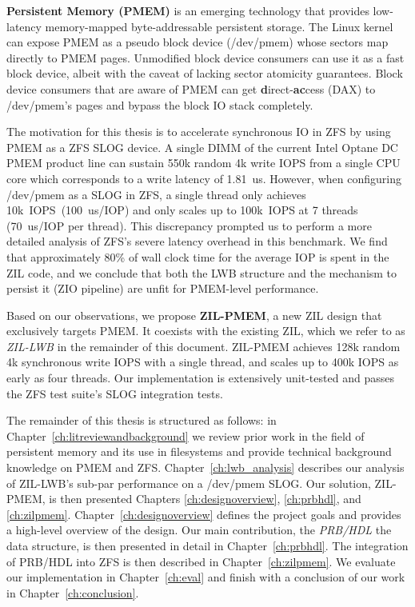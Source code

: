 \documentclass[12pt,a4paper,twoside]{book}
\begin{document}
\textbf{Persistent Memory (PMEM)} is an emerging technology that provides low-latency memory-mapped byte-addressable persistent storage.
The Linux kernel can expose PMEM as a pseudo block device (/dev/pmem) whose sectors map directly to PMEM pages.
Unmodified block device consumers can use it as a fast block device, albeit with the caveat of lacking sector atomicity guarantees.
Block device consumers that are aware of PMEM can get \textbf{d}irect-\textbf{ac}cess (DAX) to \mbox{/dev/pmem}'s pages and bypass the block IO stack completely.

The motivation for this thesis is to accelerate synchronous IO in ZFS by using PMEM as a ZFS SLOG device.
A single DIMM of the current Intel Optane DC PMEM product line can sustain 550k random 4k write IOPS from a single CPU core which corresponds to a write latency of 1.81~us.
However, when configuring /dev/pmem as a SLOG in ZFS, a single thread only achieves 10k~IOPS~(100~us/IOP) and only scales up to 100k~IOPS at 7 threads (70~us/IOP per thread).
This discrepancy prompted us to perform a more detailed analysis of ZFS's severe latency overhead in this benchmark.
We find that approximately 80\% of wall clock time for the average IOP is spent in the ZIL code, and
we conclude that both the LWB structure and the mechanism to persist it (ZIO pipeline) are unfit for PMEM-level performance.

Based on our observations, we propose \textbf{ZIL-PMEM}, a new ZIL design that exclusively targets PMEM.
It coexists with the existing ZIL, which we refer to as \textit{ZIL-LWB} in the remainder of this document.
ZIL-PMEM achieves 128k random 4k synchronous write IOPS with a single thread, and scales up to 400k IOPS as early as four threads.
Our implementation is extensively unit-tested and passes the ZFS test suite's SLOG integration tests.

The remainder of this thesis is structured as follows:
in Chapter~\ref{ch:litreviewandbackground} we
 review prior work in the field of persistent memory and its use in filesystems and
 provide technical background knowledge on PMEM and ZFS.
Chapter~\ref{ch:lwb_analysis} describes our analysis of ZIL-LWB's sub-par performance on a /dev/pmem SLOG.
Our solution, \mbox{ZIL-PMEM}, is then presented Chapters \ref{ch:designoverview}, \ref{ch:prbhdl}, and \ref{ch:zilpmem}.
Chapter~\ref{ch:designoverview} defines the project goals and provides a high-level overview of the design.
Our main contribution, the \textit{PRB/HDL} the data structure, is then presented in detail in Chapter~\ref{ch:prbhdl}.
The integration of PRB/HDL into ZFS is then described in Chapter~\ref{ch:zilpmem}.
We evaluate our implementation in Chapter~\ref{ch:eval} and finish with a conclusion of our work in Chapter~\ref{ch:conclusion}.
\end{document}
